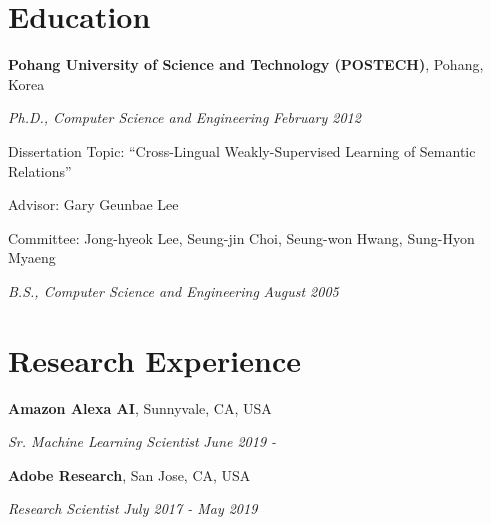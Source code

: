 \documentclass[margin,line]{res}
\newenvironment{list1}{
  \begin{list}{\ding{113}}{%
      \setlength{\itemsep}{0in}
      \setlength{\parsep}{0in} \setlength{\parskip}{0in}
      \setlength{\topsep}{0in} \setlength{\partopsep}{0in}
      \setlength{\leftmargin}{0.17in}}}{\end{list}}
\begin{document}
\begin{resume}
\section{\sc Education}
{\bf Pohang University of Science and Technology (POSTECH)}, Pohang, Korea\\
\vspace*{-.3cm}
\begin{list1}
\item[] {\em Ph.D., Computer Science and Engineering} \hfill {\em February 2012}\\
  \vspace*{-.3cm}
  \begin{list1}
  \item [] Dissertation Topic:  ``Cross-Lingual Weakly-Supervised Learning of Semantic Relations''
  \item [] Advisor:  Gary Geunbae Lee
  \item [] Committee: Jong-hyeok Lee, Seung-jin Choi, Seung-won Hwang, Sung-Hyon Myaeng
  \end{list1}
  \vspace*{.3cm}
\item[] {\em B.S., Computer Science and Engineering} \hfill {\em August 2005}\\
  \vspace*{-.3cm}
\end{list1}

\section{\sc Research Experience}
{\bf Amazon Alexa AI}, Sunnyvale, CA, USA\\
\vspace{-.3cm}
\begin{list1}
\item[] {\em Sr. Machine Learning Scientist} \hfill {\em June 2019 -}\\
  \vspace{-.3cm}
\end{list1}

{\bf Adobe Research}, San Jose, CA, USA\\
\vspace{-.3cm}
\begin{list1}
\item[] {\em Research Scientist} \hfill {\em July 2017 - May 2019}\\
  \vspace{-.3cm}
\end{list1}


\end{resume}
\end{document}
